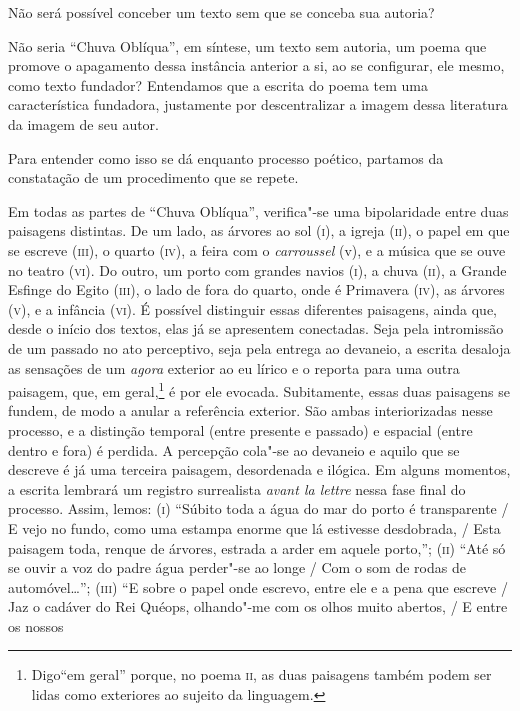 Não será possível conceber um texto sem que se conceba sua autoria?

Não seria ``Chuva Oblíqua'', em síntese, um texto sem autoria, um poema
que promove o apagamento dessa instância anterior a si, ao se
configurar, ele mesmo, como texto fundador? Entendamos que a escrita do
poema tem uma característica fundadora, justamente por descentralizar a
imagem dessa literatura da imagem de seu autor.

Para entender como isso se dá enquanto processo poético, partamos da
constatação de um procedimento que se repete.

Em todas as partes de ``Chuva Oblíqua'', verifica"-se uma bipolaridade
entre duas paisagens distintas. De um lado, as árvores ao sol
(\textsc{i}), a igreja (\textsc{ii}), o papel em que se escreve
(\textsc{iii}), o quarto (\textsc{iv}), a feira com o \emph{carroussel}
(v), e a música que se ouve no teatro (\textsc{vi}). Do outro, um porto
com grandes navios (\textsc{i}), a chuva (\textsc{ii}), a Grande Esfinge
do Egito (\textsc{iii}), o lado de fora do quarto, onde é Primavera
(\textsc{iv}), as árvores (\textsc{v}), e a infância (\textsc{vi}). É
possível distinguir essas diferentes paisagens, ainda que, desde o
início dos textos, elas já se apresentem conectadas. Seja pela
intromissão de um passado no ato perceptivo, seja pela entrega ao
devaneio, a escrita desaloja as sensações de um \emph{agora} exterior ao
eu lírico e o reporta para uma outra paisagem, que, em geral,\footnote{Digo``em
  geral'' porque, no poema \textsc{ii}, as duas paisagens também podem
  ser lidas como exteriores ao sujeito da linguagem.} é por ele evocada.
Subitamente, essas duas paisagens se fundem, de modo a anular a
referência exterior. São ambas interiorizadas nesse processo, e a
distinção temporal (entre presente e passado) e espacial (entre dentro e
fora) é perdida. A percepção cola"-se ao devaneio e aquilo que se
descreve é já uma terceira paisagem, desordenada e ilógica. Em alguns
momentos, a escrita lembrará um registro surrealista \emph{avant la
lettre} nessa fase final do processo. Assim, lemos: (\textsc{i})
``Súbito toda a água do mar do porto é transparente / E vejo no fundo,
como uma estampa enorme que lá estivesse desdobrada, / Esta paisagem
toda, renque de árvores, estrada a arder em aquele porto,'';
(\textsc{ii}) ``Até só se ouvir a voz do padre água perder"-se ao longe /
Com o som de rodas de automóvel\ldots{}''; (\textsc{iii}) ``E sobre o papel
onde escrevo, entre ele e a pena que escreve / Jaz o cadáver do Rei
Quéops, olhando"-me com os olhos muito abertos, / E entre os nossos
